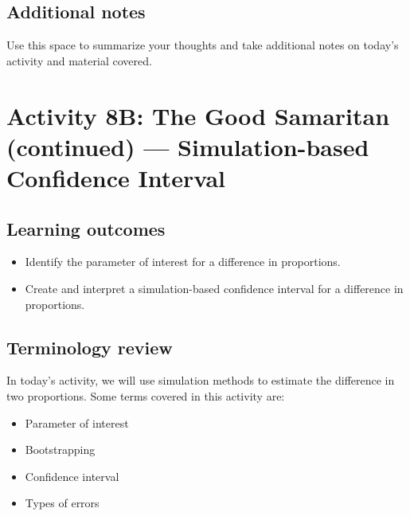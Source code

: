 \documentclass[
]{report}
\begin{document}
\hypertarget{additional-notes-12}{%
\subsection{Additional notes}\label{additional-notes-12}}

Use this space to summarize your thoughts and take additional notes on today's activity and material covered.

\newpage

\hypertarget{activity-8b-the-good-samaritan-continued-simulation-based-confidence-interval}{%
\section{Activity 8B: The Good Samaritan (continued) --- Simulation-based Confidence Interval}\label{activity-8b-the-good-samaritan-continued-simulation-based-confidence-interval}}


\hypertarget{learning-outcomes-15}{%
\subsection{Learning outcomes}\label{learning-outcomes-15}}

\begin{itemize}
\item
  Identify the parameter of interest for a difference in proportions.
\item
  Create and interpret a simulation-based confidence interval for a difference in proportions.
\end{itemize}

\hypertarget{terminology-review-14}{%
\subsection{Terminology review}\label{terminology-review-14}}

In today's activity, we will use simulation methods to estimate the difference in two proportions. Some terms covered in this activity are:

\begin{itemize}
\item
  Parameter of interest
\item
  Bootstrapping
\item
  Confidence interval
\item
  Types of errors
\end{itemize}
\end{document}

